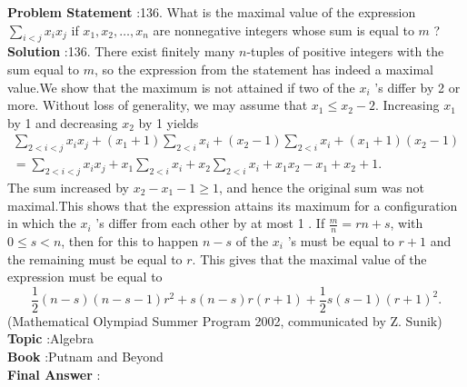 \documentclass[10pt]{article}
\begin{document}
\textbf{Problem Statement} :136. What is the maximal value of the expression $\sum_{i<j} x_{i} x_{j}$ if $x_{1}, x_{2}, \ldots, x_{n}$ are nonnegative integers whose sum is equal to $m$ ?\\
\textbf{Solution} :136. There exist finitely many $n$-tuples of positive integers with the sum equal to $m$, so the expression from the statement has indeed a maximal value.We show that the maximum is not attained if two of the $x_{i}$ 's differ by 2 or more. Without loss of generality, we may assume that $x_{1} \leq x_{2}-2$. Increasing $x_{1}$ by 1 and decreasing $x_{2}$ by 1 yields$$ \begin{array}{r} \sum_{2<i<j} x_{i} x_{j}+\left(x_{1}+1\right) \sum_{2<i} x_{i}+\left(x_{2}-1\right) \sum_{2<i} x_{i}+\left(x_{1}+1\right)\left(x_{2}-1\right) \\ =\sum_{2<i<j} x_{i} x_{j}+x_{1} \sum_{2<i} x_{i}+x_{2} \sum_{2<i} x_{i}+x_{1} x_{2}-x_{1}+x_{2}+1 . \end{array} $$The sum increased by $x_{2}-x_{1}-1 \geq 1$, and hence the original sum was not maximal.This shows that the expression attains its maximum for a configuration in which the $x_{i}$ 's differ from each other by at most 1 . If $\frac{m}{n}=r n+s$, with $0 \leq s<n$, then for this to happen $n-s$ of the $x_{i}$ 's must be equal to $r+1$ and the remaining must be equal to $r$. This gives that the maximal value of the expression must be equal to$$ \frac{1}{2}(n-s)(n-s-1) r^{2}+s(n-s) r(r+1)+\frac{1}{2} s(s-1)(r+1)^{2} . $$(Mathematical Olympiad Summer Program 2002, communicated by Z. Sunik)\\
\textbf{Topic} :Algebra\\
\textbf{Book} :Putnam and Beyond\\
\textbf{Final Answer} :\\
\end{document}
